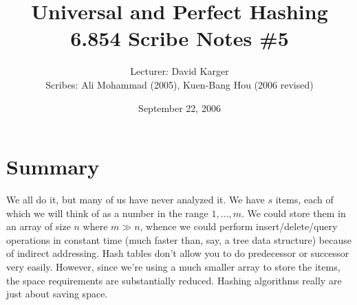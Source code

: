 \documentclass{article}
\begin{document}
\newcommand{\mod}{\hbox{mod }}

\title{Universal and Perfect Hashing\\ 6.854 Scribe Notes \#5}
\date{September 22, 2006}
\author{Lecturer: David Karger\\ Scribes: Ali Mohammad (2005), Kuen-Bang Hou (2006 revised)}


%
%
%
%

%



\section{Summary}

We all do it, but many of us have never analyzed it.  We have $s$ items,
each of which we will think of as a number in the range $1, \ldots, m$.
We could store them in an array of size $n$ where $m \gg n$, whence we could perform
insert/delete/query operations in constant time (much faster than, say,
a tree data structure) because of indirect addressing.  Hash tables don't
allow you to do predecessor or successor very easily.  However, since
we're using a much smaller array to store the items, the space requirements
are substantially reduced.  Hashing algorithms really are just about saving space.
\end{document}
